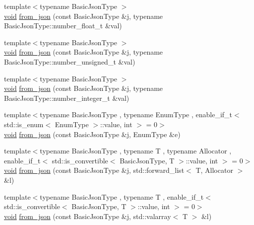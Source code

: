 \begin{DoxyCompactItemize}
\item 
{\footnotesize template$<$typename Basic\+Json\+Type $>$ }\\\hyperlink{namespacenlohmann_1_1detail_a59fca69799f6b9e366710cb9043aa77d}{void} \hyperlink{namespacenlohmann_1_1detail_a7cb5dd7d46a60e65f9a8e0873b3f7dd8}{from\+\_\+json} (const Basic\+Json\+Type \&j, typename Basic\+Json\+Type\+::number\+\_\+float\+\_\+t \&val)
\item 
{\footnotesize template$<$typename Basic\+Json\+Type $>$ }\\\hyperlink{namespacenlohmann_1_1detail_a59fca69799f6b9e366710cb9043aa77d}{void} \hyperlink{namespacenlohmann_1_1detail_ace4d5680ba413d9fd897ccb5d9c61a1c}{from\+\_\+json} (const Basic\+Json\+Type \&j, typename Basic\+Json\+Type\+::number\+\_\+unsigned\+\_\+t \&val)
\item 
{\footnotesize template$<$typename Basic\+Json\+Type $>$ }\\\hyperlink{namespacenlohmann_1_1detail_a59fca69799f6b9e366710cb9043aa77d}{void} \hyperlink{namespacenlohmann_1_1detail_a047d881e611fcac709dc318f730a1732}{from\+\_\+json} (const Basic\+Json\+Type \&j, typename Basic\+Json\+Type\+::number\+\_\+integer\+\_\+t \&val)
\item 
{\footnotesize template$<$typename Basic\+Json\+Type , typename Enum\+Type , enable\+\_\+if\+\_\+t$<$ std\+::is\+\_\+enum$<$ Enum\+Type $>$\+::value, int $>$  = 0$>$ }\\\hyperlink{namespacenlohmann_1_1detail_a59fca69799f6b9e366710cb9043aa77d}{void} \hyperlink{namespacenlohmann_1_1detail_a5440d650150d01e8015133521351b459}{from\+\_\+json} (const Basic\+Json\+Type \&j, Enum\+Type \&e)
\item 
{\footnotesize template$<$typename Basic\+Json\+Type , typename T , typename Allocator , enable\+\_\+if\+\_\+t$<$ std\+::is\+\_\+convertible$<$ Basic\+Json\+Type, T $>$\+::value, int $>$  = 0$>$ }\\\hyperlink{namespacenlohmann_1_1detail_a59fca69799f6b9e366710cb9043aa77d}{void} \hyperlink{namespacenlohmann_1_1detail_a5cfb765aad92795abd7fda29d017272a}{from\+\_\+json} (const Basic\+Json\+Type \&j, std\+::forward\+\_\+list$<$ T, Allocator $>$ \&l)
\item 
{\footnotesize template$<$typename Basic\+Json\+Type , typename T , enable\+\_\+if\+\_\+t$<$ std\+::is\+\_\+convertible$<$ Basic\+Json\+Type, T $>$\+::value, int $>$  = 0$>$ }\\\hyperlink{namespacenlohmann_1_1detail_a59fca69799f6b9e366710cb9043aa77d}{void} \hyperlink{namespacenlohmann_1_1detail_a3df497b1d3977f071b488ecac1401517}{from\+\_\+json} (const Basic\+Json\+Type \&j, std\+::valarray$<$ T $>$ \&l)

\end{DoxyCompactItemize}
